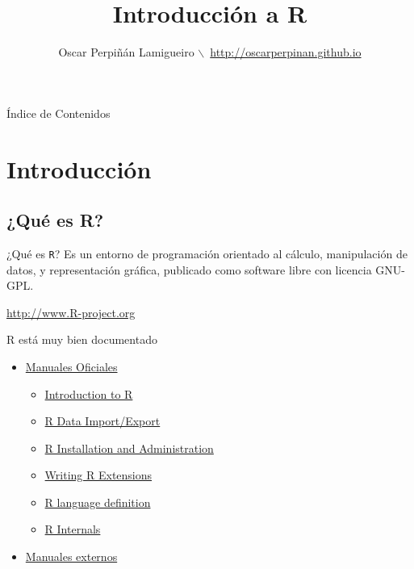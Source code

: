 \documentclass[xcolor={usenames,svgnames,dvipsnames}]{beamer}
\author{Oscar Perpiñán Lamigueiro $\backslash$\ \url{http://oscarperpinan.github.io}}
\date{}
\title{Introducción a R}
\begin{document}
\maketitle

\begin{frame}[label={sec:org54dbffe}]{Índice de Contenidos}
\setcounter{tocdepth}{1}
\tableofcontents
\end{frame}

\section{Introducción}
\label{sec:org28bd36f}

\subsection{¿Qué es R?}
\label{sec:orgd1223c1}
\begin{frame}[fragile,label={sec:org1bf956a}]{¿Qué es \texttt{R}?}
 Es un entorno de programación orientado al cálculo, manipulación de datos, y representación gráfica, publicado como software libre con licencia GNU-GPL.
\begin{center}
\url{http://www.R-project.org} 
\end{center}
\end{frame}

\begin{frame}[label={sec:orged729de}]{R está muy bien documentado}
\begin{itemize}
\item \href{http://cran.r-project.org/manuals.html}{Manuales Oficiales}

\begin{itemize}
\item \href{http://cran.r-project.org/doc/manuals/r-release/R-intro.html}{Introduction to R}

\item \href{http://cran.r-project.org/doc/manuals/r-release/R-data.html}{R Data Import/Export}

\item \href{http://cran.r-project.org/doc/manuals/r-release/R-admin.html}{R Installation and Administration}

\item \href{http://cran.r-project.org/doc/manuals/r-release/R-exts.html}{Writing R Extensions}

\item \href{http://cran.r-project.org/doc/manuals/r-release/R-lang.html}{R language definition}

\item \href{http://cran.r-project.org/doc/manuals/r-release/R-ints.html}{R Internals}
\end{itemize}

\item \href{http://cran.r-project.org/other-docs.html}{Manuales externos}
\end{itemize}
\end{frame}
\end{document}
